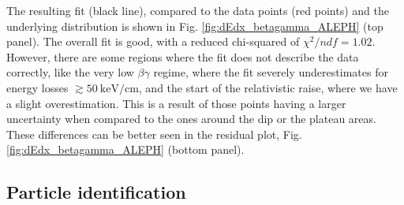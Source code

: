 The resulting fit (black line), compared to the data points (red points) and the underlying distribution is shown in Fig. \ref{fig:dEdx_betagamma_ALEPH} (top panel). The overall fit is good, with a reduced chi-squared of $\chi^{2}/ndf=1.02$. However, there are some regions where the fit does not describe the data correctly, like the very low $\beta\gamma$ regime, where the fit severely underestimates for energy losses $\gtrsim 50 ~ \mathrm{keV}/\mathrm{cm}$, and the start of the relativistic raise, where we have a slight overestimation. This is a result of those points having a larger uncertainty when compared to the ones around the dip or the plateau areas. These differences can be better seen in the residual plot, Fig. \ref{fig:dEdx_betagamma_ALEPH} (bottom panel).

\subsection{Particle identification}

